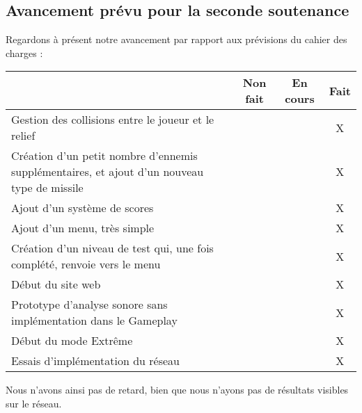\documentclass[12pt,a4paper]{article}
\begin{document}
		\subsection{Avancement prévu pour la seconde soutenance}
		Regardons à présent notre avancement par rapport aux prévisions du cahier des charges :
		\begin{center}
			\begin{tabular}{|p{9cm}|c|c|c|}
			\hline
				& Non fait & En cours & Fait \\ \hline
				Gestion des collisions entre le joueur et le relief & & & X \\ \hline
				Création d'un petit nombre d'ennemis supplémentaires, et ajout d'un nouveau type de missile & & & X \\ \hline
				Ajout d'un système de scores & & & X \\ \hline
				Ajout d'un menu, très simple & & & X \\ \hline
				Création d'un niveau de test qui, une fois complété, renvoie vers le menu & & & X\\ \hline
				Début du site web & & & X\\ \hline
				Prototype d'analyse sonore sans implémentation dans le Gameplay & & & X\\ \hline
				Début du mode Extrême & & & X\\ \hline
				Essais d'implémentation du réseau & &  & X \\ \hline
			\end{tabular}
		\end{center}
		Nous n'avons ainsi pas de retard, bien que nous n'ayons pas de résultats visibles sur le réseau.
		\newpage
\end{document}
